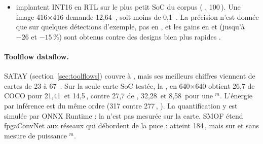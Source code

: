 \begin{itemize}
    , pour 12,3\, au wattmètre de carte et 7,8\, de puce estimés par Vivado
    . C'est la seule paire puce/carte FPGA du corpus, mais la puce est
    estimée. Le débit n'est donné qu'en /s, sans .
  \item \citet{2025-kim-design-implementation-yolov2-accelerator-zynq} implantent 
    INT16 en RTL sur le plus petit SoC du corpus ( , 100\,). Une image
    416$\times$416 demande 12,64\, , soit moins de 0,1\, \deduit. La
    précision n'est donnée que sur quelques détections d'exemple, pas en 
    , et les gains en  et  (jusqu'à $-26$ et $-15$\,\%) sont obtenus
    contre des designs bien plus rapides .
\end{itemize}

\paragraph{Toolflow dataflow.} SATAY (section~\ref{sec:toolflows}) couvre  à
, mais ses meilleurs chiffres viennent de cartes  de 23 à 67\,
. Sur la seule carte SoC testée, la ,  en 640$\times$640
obtient 26,7 de  COCO pour 21,41\, et 14,5\,, contre 27,7 de , 32,28\, et
8,58\, pour une  $^{m}$. L'énergie par inférence est du même
ordre (317 contre 277\,, ). La quantification y est simulée par ONNX
Runtime  : la  n'est pas mesurée sur la carte. SMOF
\citep{arxiv-2403.18921-smof-streaming-modern-cnns-fpgas}\pp{} étend fpgaConvNet aux
réseaux qui débordent de la puce :  atteint 184\,, mais sur  et sans
mesure de puissance $^{m}$.

